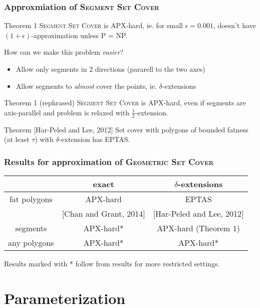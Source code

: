 \documentclass{beamer}
\begin{document}
\begin{frame}
\frametitle{Approxmiation of \textsc{Segment Set Cover}}
\begin{block}{Theorem 1}
	\textsc{Segment Set Cover} is APX-hard, ie.\newline
	for small $\epsilon =0.001$,
	doesn't have $(1+\epsilon)$-approximation unless P = NP.
\end{block}

How can we make this problem \textit{easier}?
\begin{itemize}
\item Allow only segments in 2 directions (pararell to the two axes)
\item Allow segments to \textit{almost} cover the points, ie. $\delta$-extensions
\end{itemize}

\begin{block}{Theorem 1 (rephrased)}
	\textsc{Segment Set Cover} is APX-hard, even if segments are axis-parallel
	and problem is relaxed with $\frac{1}{2}$-extension.
\end{block}


\begin{block}{Theorem [Har-Peled and Lee, 2012]}
	Set cover with polygons of bounded fatness (at least $\tau$)
	with $\delta$-extension has EPTAS.
\end{block}

\end{frame}


\begin{frame}
\frametitle{Results for approximation of \textsc{Geometric Set Cover}}
\begin{tabular}{|c|c|c|}
\hline
           & exact & $\delta$-extensions \\
\hline
fat polygons & APX-hard  &  EPTAS \\
& [Chan and Grant, 2014] & [Har-Peled and Lee, 2012] \\
\hline
segments & \textcolor{olivegreen}{APX-hard*} & \textcolor{olivegreen}{APX-hard (Theorem 1)} \\
\hline
any polygons & APX-hard* &  \textcolor{olivegreen}{APX-hard*} \\
\hline
\end{tabular}

\bigskip
Results marked with * follow from results for more restricted settings.

\end{frame}

\section{Parameterization}
\end{document}
